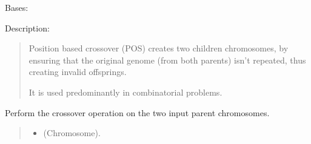 \documentclass[letterpaper,10pt,english]{sphinxmanual}
\begin{document}
\begin{fulllineitems}
\label{\detokenize{pygenalgo.operators.crossover:pygenalgo.operators.crossover.position_based_crossover.PositionBasedCrossover}}
\pysigstartsignatures
{}
\pysigstopsignatures
\sphinxAtStartPar
Bases: {\hyperref[\detokenize{pygenalgo.operators.crossover:pygenalgo.operators.crossover.crossover_operator.CrossoverOperator}]{}}

\sphinxAtStartPar
Description:
\begin{quote}

\sphinxAtStartPar
Position based crossover (POS) creates two children chromosomes, by ensuring that the
original genome (from both parents) isn’t repeated, thus creating invalid offsprings.

\sphinxAtStartPar
It is used predominantly in combinatorial problems.
\end{quote}

\begin{fulllineitems}
\label{\detokenize{pygenalgo.operators.crossover:pygenalgo.operators.crossover.position_based_crossover.PositionBasedCrossover.crossover}}
\pysigstartsignatures
{}
\pysigstopsignatures
\sphinxAtStartPar
Perform the crossover operation on the two input parent chromosomes.
\begin{quote}\begin{description}
\begin{itemize}
\item {} 
\sphinxAtStartPar
{} \textendash{} (Chromosome).


\end{itemize}
\end{description}
\end{quote}
\end{fulllineitems}
\end{fulllineitems}
\end{document}
